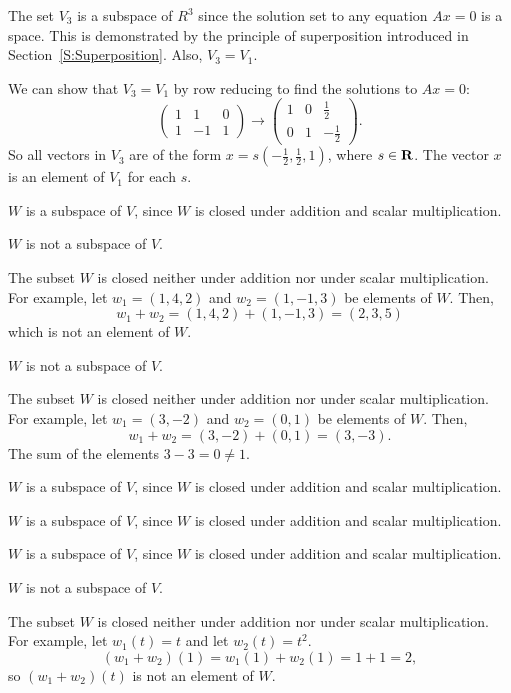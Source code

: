 \documentclass{ximera}
\begin{document}
The set $V_3$ is a subspace of $R^3$ since the solution set to
any equation $Ax = 0$ is a space.  This is demonstrated by the
principle of superposition introduced in Section~\ref{S:Superposition}.
Also, $V_3 = V_1$.  

\para We can show that $V_3 = V_1$ by row reducing to find the
solutions to $Ax = 0$:
\[
\left(\begin{array}{rrr} 1 & 1 & 0 \\ 1 & -1 & 1
\end{array}\right) \longrightarrow \left(\begin{array}{rrr} 1 & 0 &
\frac{1}{2} \\ 0 & 1 & -\frac{1}{2} \end{array}\right).
\]
So all vectors in $V_3$ are of the form $x = s(-\frac{1}{2},
\frac{1}{2}, 1)$, where $s \in \mbox{$\bf{R}$}$.  The vector $x$ is an element
of $V_1$ for each $s$.

\newpage
{} $W$ is a subspace of $V$, since $W$ is closed under
addition and scalar multiplication.

 \ans $W$ is not a subspace of $V$.

\soln The subset $W$ is closed neither under addition nor under scalar
multiplication.  For example, let $w_1 = (1,4,2)$ and $w_2 = (1,-1,3)$
be elements of $W$.  Then,
\[
w_1 + w_2 = (1,4,2) + (1,-1,3) = (2,3,5)
\]
which is not an element of $W$.


 \ans $W$ is not a subspace of $V$.

\soln The subset $W$ is closed neither under addition nor under scalar
multiplication.  For example, let $w_1 = (3,-2)$ and $w_2 = (0,1)$ be
elements of $W$.  Then,
\[
w_1 + w_2 = (3,-2) + (0,1) = (3,-3).
\]
The sum of the elements $3 - 3 = 0 \neq 1$.

 $W$ is a subspace of $V$, since $W$ is closed under
addition and scalar multiplication.

 $W$ is a subspace of $V$, since $W$ is closed under
addition and scalar multiplication.

 $W$ is a subspace of $V$, since $W$ is closed under
addition and scalar multiplication.

 \ans $W$ is not a subspace of $V$.

\soln The subset $W$ is closed neither under addition nor under scalar
multiplication.  For example, let $w_1(t) = t$ and let $w_2(t) = t^2$.
\[
(w_1 + w_2)(1) = w_1(1) + w_2(1) = 1 + 1 = 2,
\]
so $(w_1 + w_2)(t)$ is not an element of $W$.
\end{document}
